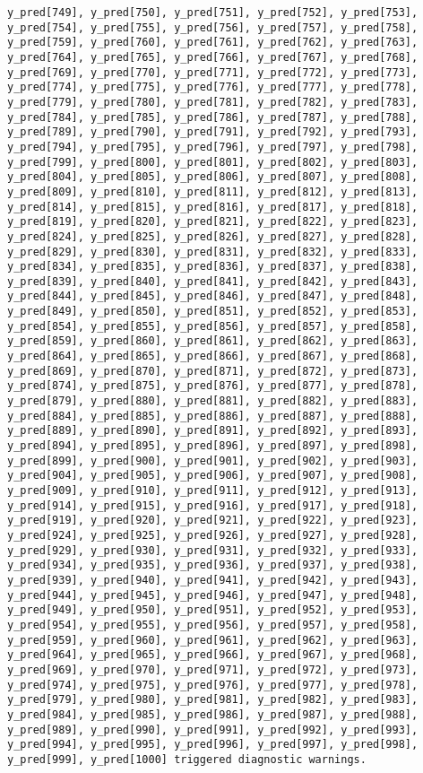 \documentclass[
  letterpaper,
  DIV=11,
  numbers=noendperiod]{scrartcl}
\begin{document}
\begin{verbatim}
y_pred[749], y_pred[750], y_pred[751], y_pred[752], y_pred[753],
y_pred[754], y_pred[755], y_pred[756], y_pred[757], y_pred[758],
y_pred[759], y_pred[760], y_pred[761], y_pred[762], y_pred[763],
y_pred[764], y_pred[765], y_pred[766], y_pred[767], y_pred[768],
y_pred[769], y_pred[770], y_pred[771], y_pred[772], y_pred[773],
y_pred[774], y_pred[775], y_pred[776], y_pred[777], y_pred[778],
y_pred[779], y_pred[780], y_pred[781], y_pred[782], y_pred[783],
y_pred[784], y_pred[785], y_pred[786], y_pred[787], y_pred[788],
y_pred[789], y_pred[790], y_pred[791], y_pred[792], y_pred[793],
y_pred[794], y_pred[795], y_pred[796], y_pred[797], y_pred[798],
y_pred[799], y_pred[800], y_pred[801], y_pred[802], y_pred[803],
y_pred[804], y_pred[805], y_pred[806], y_pred[807], y_pred[808],
y_pred[809], y_pred[810], y_pred[811], y_pred[812], y_pred[813],
y_pred[814], y_pred[815], y_pred[816], y_pred[817], y_pred[818],
y_pred[819], y_pred[820], y_pred[821], y_pred[822], y_pred[823],
y_pred[824], y_pred[825], y_pred[826], y_pred[827], y_pred[828],
y_pred[829], y_pred[830], y_pred[831], y_pred[832], y_pred[833],
y_pred[834], y_pred[835], y_pred[836], y_pred[837], y_pred[838],
y_pred[839], y_pred[840], y_pred[841], y_pred[842], y_pred[843],
y_pred[844], y_pred[845], y_pred[846], y_pred[847], y_pred[848],
y_pred[849], y_pred[850], y_pred[851], y_pred[852], y_pred[853],
y_pred[854], y_pred[855], y_pred[856], y_pred[857], y_pred[858],
y_pred[859], y_pred[860], y_pred[861], y_pred[862], y_pred[863],
y_pred[864], y_pred[865], y_pred[866], y_pred[867], y_pred[868],
y_pred[869], y_pred[870], y_pred[871], y_pred[872], y_pred[873],
y_pred[874], y_pred[875], y_pred[876], y_pred[877], y_pred[878],
y_pred[879], y_pred[880], y_pred[881], y_pred[882], y_pred[883],
y_pred[884], y_pred[885], y_pred[886], y_pred[887], y_pred[888],
y_pred[889], y_pred[890], y_pred[891], y_pred[892], y_pred[893],
y_pred[894], y_pred[895], y_pred[896], y_pred[897], y_pred[898],
y_pred[899], y_pred[900], y_pred[901], y_pred[902], y_pred[903],
y_pred[904], y_pred[905], y_pred[906], y_pred[907], y_pred[908],
y_pred[909], y_pred[910], y_pred[911], y_pred[912], y_pred[913],
y_pred[914], y_pred[915], y_pred[916], y_pred[917], y_pred[918],
y_pred[919], y_pred[920], y_pred[921], y_pred[922], y_pred[923],
y_pred[924], y_pred[925], y_pred[926], y_pred[927], y_pred[928],
y_pred[929], y_pred[930], y_pred[931], y_pred[932], y_pred[933],
y_pred[934], y_pred[935], y_pred[936], y_pred[937], y_pred[938],
y_pred[939], y_pred[940], y_pred[941], y_pred[942], y_pred[943],
y_pred[944], y_pred[945], y_pred[946], y_pred[947], y_pred[948],
y_pred[949], y_pred[950], y_pred[951], y_pred[952], y_pred[953],
y_pred[954], y_pred[955], y_pred[956], y_pred[957], y_pred[958],
y_pred[959], y_pred[960], y_pred[961], y_pred[962], y_pred[963],
y_pred[964], y_pred[965], y_pred[966], y_pred[967], y_pred[968],
y_pred[969], y_pred[970], y_pred[971], y_pred[972], y_pred[973],
y_pred[974], y_pred[975], y_pred[976], y_pred[977], y_pred[978],
y_pred[979], y_pred[980], y_pred[981], y_pred[982], y_pred[983],
y_pred[984], y_pred[985], y_pred[986], y_pred[987], y_pred[988],
y_pred[989], y_pred[990], y_pred[991], y_pred[992], y_pred[993],
y_pred[994], y_pred[995], y_pred[996], y_pred[997], y_pred[998],
y_pred[999], y_pred[1000] triggered diagnostic warnings.


\end{verbatim}
\end{document}
